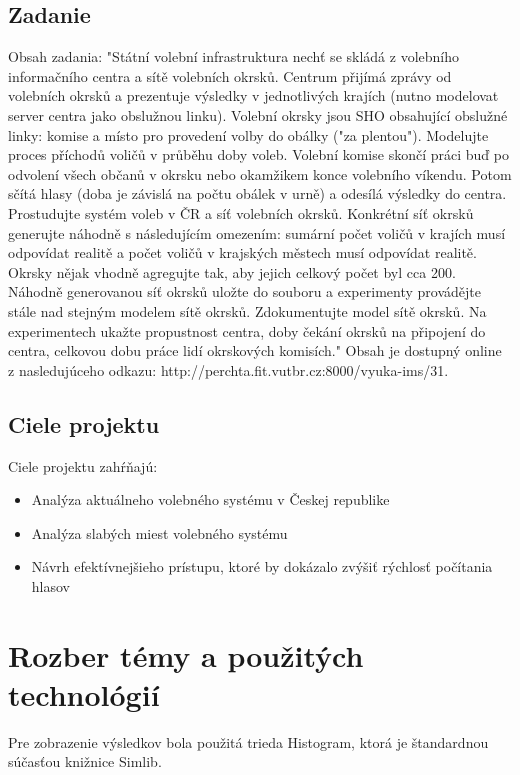 \documentclass[12pt,a4paper,titlepage,final]{article}
\begin{document}
\subsection{Zadanie}
Obsah zadania: "Státní volební infrastruktura nechť se skládá z volebního informačního centra a sítě volebních okrsků. Centrum přijímá zprávy od volebních okrsků a prezentuje výsledky v jednotlivých krajích (nutno modelovat server centra jako obslužnou linku). Volební okrsky jsou SHO obsahující obslužné linky: komise a místo pro provedení volby do obálky ("za plentou"). Modelujte proces příchodů voličů v průběhu doby voleb. Volební komise skončí práci buď po odvolení všech občanů v okrsku nebo okamžikem konce volebního víkendu. Potom sčítá hlasy (doba je závislá na počtu obálek v urně) a odesílá výsledky do centra. Prostudujte systém voleb v ČR a síť volebních okrsků. Konkrétní síť okrsků generujte náhodně s následujícím omezením: sumární počet voličů v krajích musí odpovídat realitě a počet voličů v krajských městech musí odpovídat realitě. Okrsky nějak vhodně agregujte tak, aby jejich celkový počet byl cca 200. Náhodně generovanou síť okrsků uložte do souboru a experimenty provádějte stále nad stejným modelem sítě okrsků. Zdokumentujte model sítě okrsků. Na experimentech ukažte propustnost centra, doby čekání okrsků na připojení do centra, celkovou dobu práce lidí okrskových komisích."
Obsah je dostupný online z nasledujúceho odkazu: http://perchta.fit.vutbr.cz:8000/vyuka-ims/31.\cite{Prokop:Algoritmy}



\subsection{Ciele projektu}
Ciele projektu zahŕňajú:
\begin{itemize}
\item Analýza aktuálneho volebného systému v Českej republike
\item Analýza slabých miest volebného systému
\item Návrh efektívnejšieho prístupu, ktoré by dokázalo zvýšiť rýchlosť počítania hlasov
\end{itemize}


\section{Rozber témy a použitých technológií}

\indent


Pre zobrazenie výsledkov bola použitá trieda Histogram, ktorá je štandardnou súčasťou knižnice Simlib.
\end{document}
